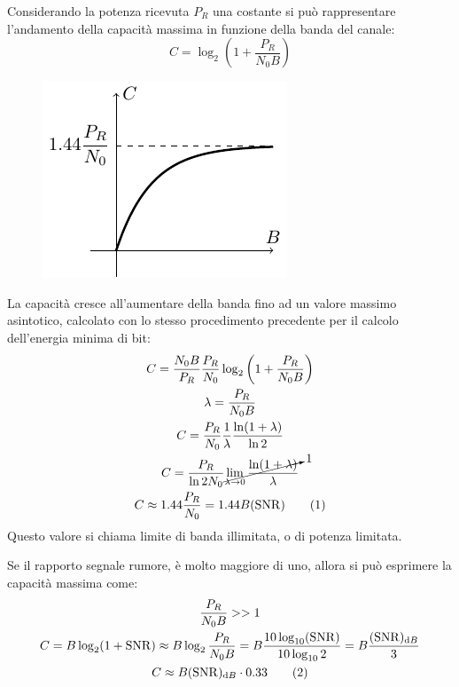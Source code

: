 \documentclass{article}
\newcommand{\df}{\mathrm{d}}
\newcommand{\tageq}{\tag{\stepcounter{equation}\theequation}}
\numberwithin{equation}{subsection}
\begin{document}
Considerando la potenza ricevuta $P_R$ una costante si può rappresentare l'andamento della capacità massima in funzione della banda del canale:
\begin{equation*}
    C=\log_2\left(\displaystyle1+\frac{P_R}{N_0B}\right)
\end{equation*}
\begin{figure}[H]%
    \centering
    \includegraphics{shannon-2.pdf}%
\end{figure}
La capacità cresce all'aumentare della banda fino ad un valore massimo asintotico, calcolato con lo stesso procedimento precedente per il calcolo dell'energia minima di bit:
\begin{gather*}
    \displaystyle C=\frac{N_0B}{P_R}\frac{P_R}{N_0}\log_2\left(1+\frac{P_R}{N_0B}\right)\\
    \lambda=\displaystyle\frac{P_R}{N_0B}\\
    \displaystyle C=\frac{P_R}{N_0}\frac{1}{\lambda}\frac{\ln(1+\lambda)}{\ln2}\\
    C=\displaystyle\frac{P_R}{\ln2 N_0}\cancelto{1}{\lim_{\lambda\to0}\frac{\ln(1+\lambda)}{\lambda}}\\
    C\approx\displaystyle1.44\frac{P_R}{N_0}=1.44 B(\mathrm{SNR})\tageq
\end{gather*}
Questo valore si chiama limite di banda illimitata, o di potenza limitata. 

Se il rapporto segnale rumore, è molto maggiore di uno, allora si può esprimere la capacità massima come:
\begin{gather*}
    \displaystyle\frac{P_R}{N_0B}>>1\\
    C=B\log_2(1+\mathrm{SNR})\approx B\log_2\displaystyle\frac{P_R}{N_0B}=B\displaystyle\frac{10\log_{10}(\mathrm{SNR})}{10\log_{10}2}= B\frac{(\mathrm{SNR})_{\df B}}{3}\\
    C\approx B(\mathrm{SNR})_{\df B}\cdot0.33\tageq
\end{gather*}
\end{document}
